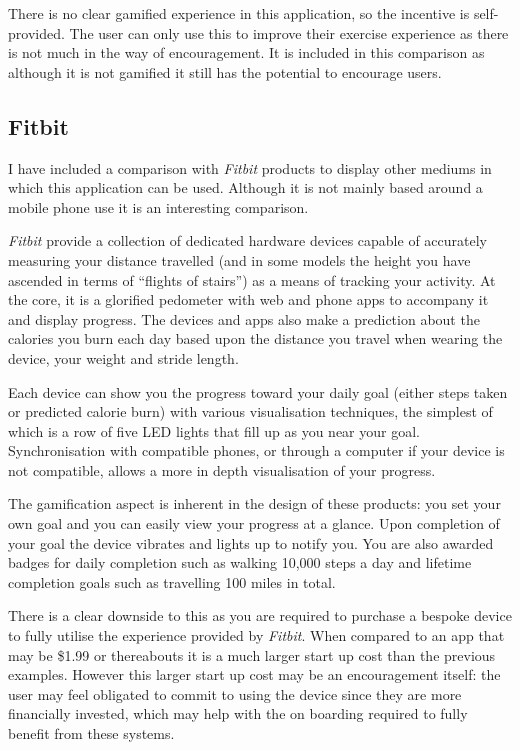 There is no clear gamified experience in this application, so the
incentive is self-provided. The user can only use this to improve
their exercise experience as there is not much in the way of
encouragement. It is included in this comparison as although it is not
gamified it still has the potential to encourage users.

\subsection{Fitbit}
\label{sec:fitbit}
I have included a comparison with \emph{Fitbit} products to display other
mediums in which this application can be used. Although it is not
mainly based around a mobile phone use it is an interesting comparison.

\emph{Fitbit} provide a collection of dedicated hardware devices capable of
accurately measuring your distance travelled (and in some models the
height you have ascended in terms of ``flights of stairs'') as a means
of tracking your activity. At the core, it is a glorified pedometer
with web and phone apps to accompany it and display progress. The
devices and apps also make a prediction about the calories you burn each
day based upon the distance you travel when wearing the device, your
weight and stride length. 

Each device can show you the progress toward your daily goal (either
steps taken or predicted calorie burn) with various visualisation
techniques, the simplest of which is a row of five LED lights that
fill up as you near your goal. Synchronisation with compatible phones,
or through a computer if your device is not compatible, allows a more
in depth visualisation of your progress.

The gamification aspect is inherent in the design of these products:
you set your own goal and you can easily view your progress at a
glance. Upon completion of your goal the device vibrates and lights up
to notify you. You are also awarded badges for daily completion such
as walking 10,000 steps a day and lifetime completion goals such as
travelling 100 miles in total.

There is a clear downside to this as you are required to purchase a
bespoke device to fully utilise the experience provided by
\emph{Fitbit}. When compared to an app that may be \$1.99 or thereabouts it is
a much larger start up cost than the previous examples. However this
larger start up cost may be an encouragement itself: the user may
feel obligated to commit to using the device since they are more
financially invested, which may help with the on boarding required to
fully benefit from these systems.

